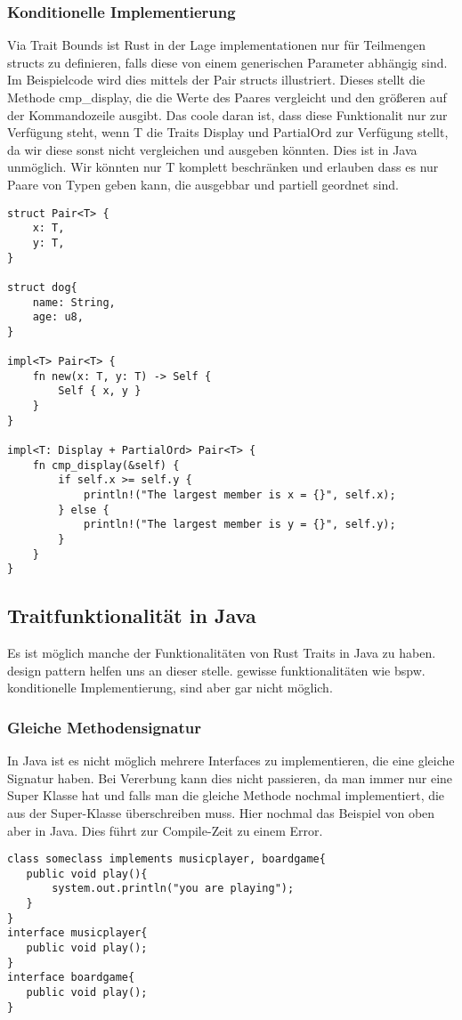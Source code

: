 \documentclass[a4paper, 1ppt]{article}
\begin{document}
\subsubsection{Konditionelle Implementierung}
Via Trait Bounds ist Rust in der Lage implementationen nur für Teilmengen structs zu definieren, falls diese von einem generischen Parameter abhängig sind.
Im Beispielcode wird dies mittels der Pair structs illustriert. Dieses stellt die Methode cmp\_display, die die Werte des Paares vergleicht und den größeren auf der Kommandozeile ausgibt.
Das coole daran ist, dass diese Funktionalit nur zur Verfügung steht, wenn T die Traits Display und PartialOrd zur Verfügung stellt, da wir diese sonst nicht vergleichen und ausgeben könnten.
Dies ist in Java unmöglich. Wir könnten nur T komplett beschränken und erlauben dass es nur Paare von Typen geben kann, die ausgebbar und partiell geordnet sind.
\begin{verbatim}
struct Pair<T> {
    x: T,
    y: T,
}

struct dog{
    name: String,
    age: u8,
}

impl<T> Pair<T> {
    fn new(x: T, y: T) -> Self {
        Self { x, y }
    }
}

impl<T: Display + PartialOrd> Pair<T> {
    fn cmp_display(&self) {
        if self.x >= self.y {
            println!("The largest member is x = {}", self.x);
        } else {
            println!("The largest member is y = {}", self.y);
        }
    }
}
\end{verbatim}
\subsection{Traitfunktionalität in Java}
Es ist möglich manche der Funktionalitäten von Rust Traits in Java zu haben.
design pattern\cite{websitedesignpatterns} helfen uns an dieser stelle. gewisse funktionalitäten wie bspw. konditionelle Implementierung, sind aber gar nicht möglich.
\subsubsection{Gleiche Methodensignatur}
In Java ist es nicht möglich mehrere Interfaces zu implementieren, die eine gleiche Signatur haben.
Bei Vererbung kann dies nicht passieren, da man immer nur eine Super Klasse hat und falls man die gleiche Methode nochmal implementiert, die aus der Super-Klasse überschreiben muss.
Hier nochmal das Beispiel von oben aber in Java. Dies führt zur Compile-Zeit zu einem Error.
\begin{verbatim}
class someclass implements musicplayer, boardgame{
   public void play(){
       system.out.println("you are playing");
   }
}
interface musicplayer{
   public void play();
}
interface boardgame{
   public void play();
}
\end{verbatim}
\end{document}
